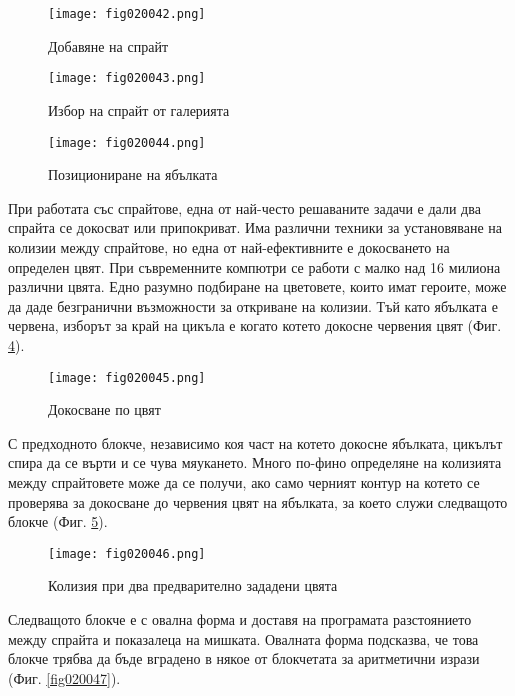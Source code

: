 \begin{figure}[H]
  \centering
  \texttt{[image: fig020042.png]}
  \caption{Добавяне на спрайт}
\label{fig020042}
\end{figure}

\begin{figure}[H]
  \centering
  \texttt{[image: fig020043.png]}
  \caption{Избор на спрайт от галерията}
\label{fig020043}
\end{figure}

\begin{figure}[H]
  \centering
  \texttt{[image: fig020044.png]}
  \caption{Позициониране на ябълката}
\label{fig020044}
\end{figure}

При работата със спрайтове, една от най-често решаваните задачи е дали два спрайта се докосват или припокриват. Има различни техники за установяване на колизии между спрайтове, но една от най-ефективните е докосването на определен цвят. При съвременните компютри се работи с малко над 16 милиона различни цвята. Едно разумно подбиране на цветовете, които имат героите, може да даде безгранични възможности за откриване на колизии. Тъй като ябълката е червена, изборът за край на цикъла е когато котето докосне червения цвят (Фиг. \ref{fig020045}).

\begin{figure}[H]
  \centering
  \texttt{[image: fig020045.png]}
  \caption{Докосване по цвят}
\label{fig020045}
\end{figure}

С предходното блокче, независимо коя част на котето докосне ябълката, цикълът спира да се върти и се чува мяукането. Много по-фино определяне на колизията между спрайтовете може да се получи, ако само черният контур на котето се проверява за докосване до червения цвят на ябълката, за което служи следващото блокче (Фиг. \ref{fig020046}).

\begin{figure}[H]
  \centering
  \texttt{[image: fig020046.png]}
  \caption{Колизия при два предварително зададени цвята}
\label{fig020046}
\end{figure}

Следващото блокче е с овална форма и доставя на програмата разстоянието между спрайта и показалеца на мишката. Овалната форма подсказва, че това блокче трябва да бъде вградено в някое от блокчетата за аритметични изрази (Фиг. \ref{fig020047}).

